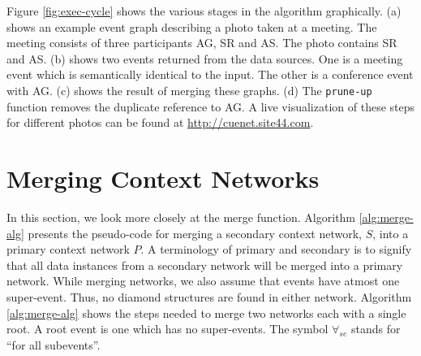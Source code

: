 Figure \ref{fig:exec-cycle} shows the various stages in the algorithm graphically. (a) shows an example event graph describing a photo taken at a meeting. The meeting consists of three participants AG, SR and AS. The photo contains SR and AS. (b) shows two events returned from the data sources. One is a meeting event which is semantically identical to the input. The other is a conference event with AG. (c) shows the result of merging these graphs. (d) The \texttt{prune-up} function removes the duplicate reference to AG. A live visualization of these steps for different photos can be found at \underline{\href{http://cuenet.site44.com/}{http://cuenet.site44.com}}.

\section{Merging Context Networks}
In this section, we look more closely at the merge function. Algorithm \ref{alg:merge-alg} presents the pseudo-code for merging a secondary context network, $S$, into a primary context network $P$. A terminology of primary and secondary is to signify that all data instances from a secondary network will be merged into a primary network. While merging networks, we also assume that events have atmost one super-event. Thus, no diamond structures are found in either network. Algorithm \ref{alg:merge-alg} shows the steps needed to merge two networks each with a single root. A root event is one which has no super-events. The symbol $\forall_{se}$ stands for ``for all subevents''.

